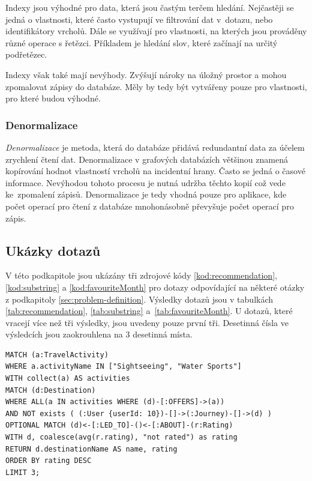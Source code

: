 \documentclass[
  program=infoi,
  biblatex=true,
  figures=true,
  glossaries=false,
  index,
  sourcecodes=true
]{kidiplom}
\begin{document}
Indexy jsou výhodné pro data, která jsou častým terčem hledání. Nejčastěji se jedná o vlastnosti, které často vystupují ve filtrování dat v~dotazu, nebo identifikátory vrcholů. Dále se využívají pro vlastnosti, na kterých jsou prováděny různé operace s řetězci. Příkladem je hledání slov, které začínají na určitý podřetězec.

Indexy však také mají nevýhody. Zvýšují nároky na úložný prostor a mohou zpomalovat zápisy do databáze. Měly by tedy být vytvářeny pouze pro vlastnosti, pro které budou výhodné.

\subsubsection{Denormalizace}
\textit{Denormalizace} je metoda, která do databáze přidává redundantní data za účelem zrychlení čtení dat. Denormalizace v grafových databázích většinou znamená kopírování hodnot vlastností vrcholů na incidentní hrany. Často se jedná o časové informace. Nevýhodou tohoto procesu je nutná udržba těchto kopií což vede ke~zpomalení zápisů. Denormalizace je tedy vhodná pouze pro aplikace, kde počet operací pro čtení z databáze mnohonásobně převyšuje počet operací pro zápis.

\subsection{Ukázky dotazů}
V této podkapitole jsou ukázány tři zdrojové kódy \ref{kod:recommendation}, \ref{kod:substring} a \ref{kod:favouriteMonth} pro dotazy odpovídající na některé otázky z podkapitoly \ref{sec:problem-definition}. Výsledky dotazů jsou v tabulkách \ref{tab:recommendation}, \ref{tab:substring} a~\ref{tab:favouriteMonth}. U dotazů, které vracejí více než tři výsledky, jsou uvedeny pouze první tři. Desetinná čísla ve výsledcích jsou zaokrouhlena na 3 desetinná místa.

\begin{listing}[h]
\begin{verbatim}
MATCH (a:TravelActivity)
WHERE a.activityName IN ["Sightseeing", "Water Sports"]
WITH collect(a) AS activities
MATCH (d:Destination)
WHERE ALL(a IN activities WHERE (d)-[:OFFERS]->(a))
AND NOT exists ( (:User {userId: 10})-[]->(:Journey)-[]->(d) )
OPTIONAL MATCH (d)<-[:LED_TO]-()<-[:ABOUT]-(r:Rating)
WITH d, coalesce(avg(r.rating), "not rated") as rating
RETURN d.destinationName AS name, rating
ORDER BY rating DESC
LIMIT 3;
\end{verbatim}
\caption[Ukázka dotazu v Cypheru]{Dotaz v Cypheru odpovídající na zadání }
\label{kod:recommendation}
\end{listing}
\end{document}
